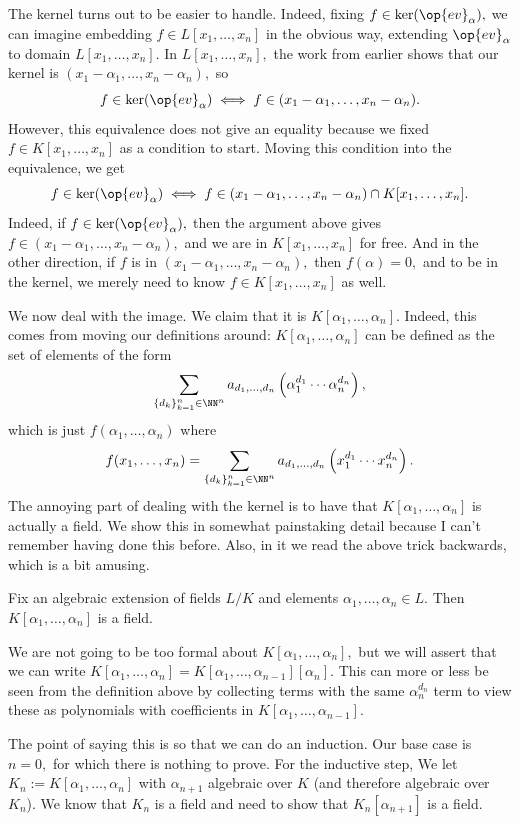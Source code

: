 The kernel turns out to be easier to handle. Indeed, fixing $f\in\ker(\op{ev}_\alpha),$ we can imagine embedding $f\in L[x_1,\ldots,x_n]$ in the obvious way, extending $\op{ev}_\alpha$ to domain $L[x_1,\ldots,x_n].$ In $L[x_1,\ldots,x_n],$ the work from earlier shows that our kernel is $(x_1-\alpha_1,\ldots,x_n-\alpha_n),$ so
\[f\in\ker(\op{ev}_\alpha)\iff f\in(x_1-\alpha_1,\ldots,x_n-\alpha_n).\]
However, this equivalence does not give an equality because we fixed $f\in K[x_1,\ldots,x_n]$ as a condition to start. Moving this condition into the equivalence, we get
\[f\in\ker(\op{ev}_\alpha)\iff f\in(x_1-\alpha_1,\ldots,x_n-\alpha_n)\cap K[x_1,\ldots,x_n].\]
Indeed, if $f\in\ker(\op{ev}_\alpha),$ then the argument above gives $f\in(x_1-\alpha_1,\ldots,x_n-\alpha_n),$ and we are in $K[x_1,\ldots,x_n]$ for free. And in the other direction, if $f$ is in $(x_1-\alpha_1,\ldots,x_n-\alpha_n),$ then $f(\alpha)=0,$ and to be in the kernel, we merely need to know $f\in K[x_1,\ldots,x_n]$ as well.

We now deal with the image. We claim that it is $K[\alpha_1,\ldots,\alpha_n].$ Indeed, this comes from moving our definitions around: $K[\alpha_1,\ldots,\alpha_n]$ can be defined as the set of elements of the form
\[\sum_{\{d_k\}_{k=1}^n\in\NN^n}a_{d_1,\ldots,d_n}\left(\alpha_1^{d_1}\cdots\alpha_n^{d_n}\right),\]
which is just $f(\alpha_1,\ldots,\alpha_n)$ where
\[f(x_1,\ldots,x_n)=\sum_{\{d_k\}_{k=1}^n\in\NN^n}a_{d_1,\ldots,d_n}\left(x_1^{d_1}\cdots x_n^{d_n}\right).\]
The annoying part of dealing with the kernel is to have that $K[\alpha_1,\ldots,\alpha_n]$ is actually a field. We show this in somewhat painstaking detail because I can't remember having done this before. Also, in it we read the above trick backwards, which is a bit amusing.
\begin{lemma}
    Fix an algebraic extension of fields $L/K$ and elements $\alpha_1,\ldots,\alpha_n\in L.$ Then $K[\alpha_1,\ldots,\alpha_n]$ is a field.
\end{lemma}
We are not going to be too formal about $K[\alpha_1,\ldots,\alpha_n],$ but we will assert that we can write $K[\alpha_1,\ldots,\alpha_n]=K[\alpha_1,\ldots,\alpha_{n-1}][\alpha_n].$ This can more or less be seen from the definition above by collecting terms with the same $\alpha_n^{d_n}$ term to  view these as polynomials with coefficients in $K[\alpha_1,\ldots,\alpha_{n-1}].$

The point of saying this is so that we can do an induction. Our base case is $n=0,$ for which there is nothing to prove. For the inductive step, We let $K_n:=K[\alpha_1,\ldots,\alpha_n]$ with $\alpha_{n+1}$ algebraic over $K$ (and therefore algebraic over $K_n$). We know that $K_n$ is a field and need to show that $K_n[\alpha_{n+1}]$ is a field.

